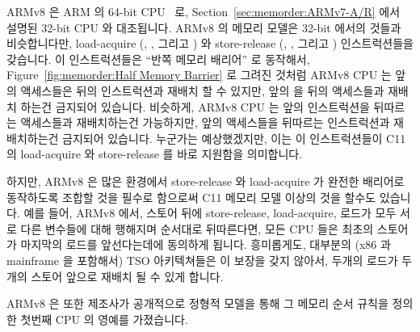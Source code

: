 ARMv8 은 ARM 의 64-bit CPU~\cite{ARMv8A:2017} 로,
Section~\ref{sec:memorder:ARMv7-A/R} 에서 설명된 32-bit CPU 와 대조됩니다.
ARMv8 의 메모리 모델은 32-bit 에서의 것들과 비슷합니다만, load-acquire
(, , 그리고 ) 와 store-release (,
, 그리고 ) 인스트럭션들을 갖습니다.
이 인스트럭션들은 ``반쪽 메모리 배리어'' 로 동작해서,
Figure~\ref{fig:memorder:Half Memory Barrier} 로 그려진 것처럼 ARMv8 CPU 는
앞의 액세스들은 뒤의  인스트럭션과 재배치 할 수 있지만, 앞의
 을 뒤의 액세스들과 재배치 하는건 금지되어 있습니다.
비슷하게, ARMv8 CPU 는 앞의  인스트럭션을 뒤따르는 액세스들과
재배치하는건 가능하지만, 앞의 액세스들을 뒤따르는  인스트럭션과
재배치하는건 금지되어 있습니다.
누군가는 예상했겠지만, 이는 이 인스트럭션들이 C11 의 load-acquire 와
store-release 를 바로 지원함을 의미합니다.

하지만, ARMv8 은 많은 환경에서 store-release 와 load-acquire 가 완전한 배리어로
동작하도록 조합할 것을 필수로 함으로써 C11 메모리 모델 이상의 것을 할수도
있습니다.
예를 들어, ARMv8 에서, 스토어 뒤에 store-release, load-acquire, 로드가 모두
서로 다른 변수들에 대해 행해지며 순서대로 뒤따른다면, 모든 CPU 들은 최초의
스토어가 마지막의 로드를 앞선다는데에 동의하게 됩니다.
흥미롭게도, 대부분의 (x86 과 mainframe 을 포함해서) TSO 아키텍쳐들은 이 보장을
갖지 않아서, 두개의 로드가 두개의 스토어 앞으로 재배치 될 수 있게 합니다.

ARMv8 은 또한 제조사가 공개적으로 정형적 모델을 통해 그 메모리 순서 규칙을
정의한 첫번째 CPU 의 영예를 가졌습니다.
\iffalse

